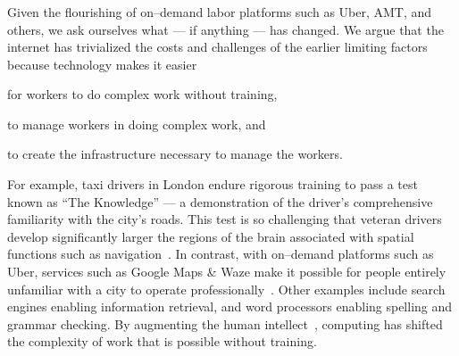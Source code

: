 \documentclass[trackingWork]{subfiles}
\begin{document}


\subsubsection{\whatchanged}
\begin{comment}
  mangeerial overhead limits, so what's different
  more people can now do complex work without training (more complex)
  parts of management can be automated (more firms)
  cheaper to create the infrastructure (more complex)
\end{comment}

Given the flourishing of on--demand labor platforms such as
Uber, AMT, and others, we ask ourselves
what --- if anything --- has changed.
We argue that
the internet has trivialized
the costs and challenges of the earlier limiting factors
because technology makes it easier
\begin{inlinelist}
  \item for workers to do complex work without training,
  \item to manage workers in doing complex work, and 
  \item to create the infrastructure necessary to manage the workers.
\end{inlinelist}

For example, taxi drivers in London endure rigorous training to pass a test known as ``The Knowledge''
--- a demonstration of the driver's comprehensive familiarity with the city's roads.
This test is so challenging that veteran drivers develop significantly larger
the regions of the brain associated with spatial functions such as navigation~\cite{Maguire11042000,Maguire2894,Skok:1999:KML:299513.299625,skok2000managing,Woollett1407,woollett2011acquiring}.
In contrast, with on--demand platforms such as Uber, services such as Google Maps \& Waze make it possible for
people entirely unfamiliar with a city
to operate professionally~\cite{silva2013traffic,hind2014outsmarting}.
Other examples include search engines enabling information retrieval, and
word processors enabling spelling and grammar checking.
By augmenting the human intellect~\cite{engelbart2001augmenting},
computing has shifted the complexity of work that is possible without training.
\end{document}
